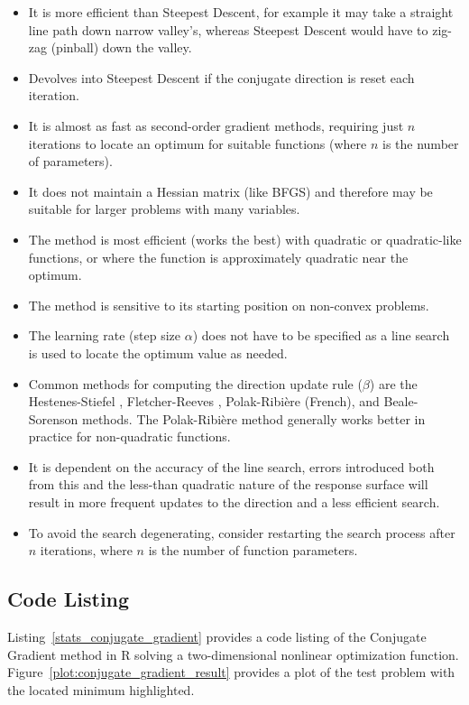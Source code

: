 \begin{itemize}
	\item It is more efficient than Steepest Descent, for example it may take a straight line path down narrow valley's, whereas Steepest Descent would have to zig-zag (pinball) down the valley.
	\item Devolves into Steepest Descent if the conjugate direction is reset each iteration.
	\item It is almost as fast as second-order gradient methods, requiring just $n$ iterations to locate an optimum for suitable functions (where $n$ is the number of parameters).
	\item It does not maintain a Hessian matrix (like BFGS) and therefore may be suitable for larger problems with many variables.
	\item The method is most efficient (works the best) with quadratic or quadratic-like functions, or where the function is approximately quadratic near the optimum.
	\item The method is sensitive to its starting position on non-convex problems.
	\item The learning rate (step size $\alpha$) does not have to be specified as a line search is used to locate the optimum value as needed.
	\item Common methods for computing the direction update rule ($\beta$) are the Hestenes-Stiefel \cite{Hestenes1952}, Fletcher-Reeves \cite{Fletcher1964}, Polak-Ribi\`ere \cite{Polak1969} (French), and Beale-Sorenson \cite{Beale1972, Sorenson1969} methods. The Polak-Ribi\`ere method generally works better in practice for non-quadratic functions.
	\item It is dependent on the accuracy of the line search, errors introduced both from this and the less-than quadratic nature of the response surface will result in more frequent updates to the direction and a less efficient search.
	\item To avoid the search degenerating, consider restarting the search process after $n$ iterations, where $n$ is the number of function parameters.
\end{itemize}


\subsection{Code Listing}
Listing~\ref{stats_conjugate_gradient} provides a code listing of the Conjugate Gradient method in R solving a two-dimensional nonlinear optimization function. Figure~\ref{plot:conjugate_gradient_result} provides a plot of the test problem with the located minimum highlighted.

